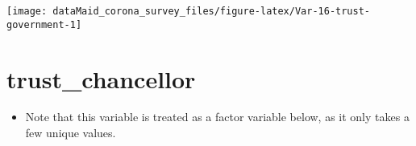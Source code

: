 \documentclass[
]{report}
\providecommand{\tightlist}{%
  \setlength{\itemsep}{0pt}\setlength{\parskip}{0pt}}
\begin{document}
\begin{minipage}{0.25 \textwidth}

\begin{center}\texttt{[image: dataMaid\_corona\_survey\_files/figure-latex/Var-16-trust-government-1]} \end{center}

\end{minipage}

\noindent\makebox[\linewidth]{\rule{\textwidth}{0.4pt}}

\hypertarget{trust_chancellor}{%
\section{trust\_chancellor}\label{trust_chancellor}}

\begin{itemize}
\tightlist
\item
  Note that this variable is treated as a factor variable below, as it
  only takes a few unique values.
\end{itemize}
\end{document}
